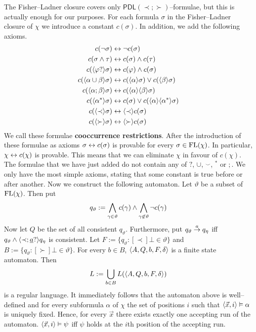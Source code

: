 The Fisher--Ladner closure covers only 
$\mathsf{PDL}(\prec;\succ)$--formulae, but this is actually enough 
for our purposes. For each formula $\sigma$ in the Fisher--Ladner 
closure of $\chi$ we introduce a constant $c(\sigma)$.
In addition, we add the following axioms.
\begin{equation}
\begin{split}
c(\neg\sigma) & \leftrightarrow \neg c(\sigma) \\
c(\sigma\wedge\tau) & \leftrightarrow c(\sigma) \wedge c(\tau) \\
c(\langle\varphi?\rangle\sigma) & \leftrightarrow c(\varphi) \wedge c(\sigma) \\
c(\langle\alpha\cup\beta\rangle\sigma) & \leftrightarrow c(\langle\alpha\rangle\sigma)
        \vee c(\langle\beta\rangle\sigma) \\
c(\langle\alpha;\beta\rangle\sigma) & \leftrightarrow c(\langle\alpha\rangle\langle\beta\rangle\sigma)
        \\
c(\langle\alpha^{\ast}\rangle\sigma) & \leftrightarrow c(\sigma) \vee 
        c(\langle\alpha\rangle\langle\alpha^{\ast}\rangle\sigma) \\
c(\langle\prec\rangle\sigma) & \leftrightarrow \langle\prec\rangle c(\sigma) \\
c(\langle\succ\rangle\sigma) & \leftrightarrow \langle\succ\rangle c(\sigma)
\end{split}
\end{equation}
We call these formulae \textbf{cooccurrence restrictions}.
After the introduction of these formulae as axioms 
$\sigma \leftrightarrow c(\sigma)$ is provable for every $\sigma \in
\operatorname{FL}(\chi)$. In particular, $\chi \leftrightarrow c(\chi)$
is provable. This means that we can eliminate $\chi$ in favour
of $c(\chi)$. The formulae that we have just added do not contain
any of $?$, $\cup$, $^{\smallsmile}$, $^{\ast}$ or $;$. We only
have the most simple axioms, stating that some constant is true
before or after another. Now we construct the following automaton.
Let $\vartheta$ be a subset of $\operatorname{FL}(\chi)$. Then put
\begin{equation}
q_{\vartheta} := \bigwedge_{\gamma \in \vartheta} c(\gamma) \wedge
    \bigwedge_{\gamma \not\in \vartheta} \neg c(\gamma)
\end{equation}
Now let $Q$ be the set of all consistent $q_{\vartheta}$.
Furthermore, put $q_{\vartheta} \stackrel{a}{\rightarrow} q_{\eta}$
iff $q_{\vartheta} \wedge \langle \prec; \underline{a}?\rangle q_{\eta}$
is consistent. Let $F := \{q_{\vartheta} : [\prec]\bot \in \vartheta\}$
and $B := \{q_{\vartheta} : [\succ]\bot \in \vartheta\}$. For every
$b \in B$, $\langle A, Q, b, F, \delta\rangle$ is a finite state
automaton. Then
\begin{equation}
L := \bigcup_{b \in B} L(\langle A, Q, b, F, \delta\rangle)
\end{equation}
is a regular language. It immediately follows that the automaton
above is well--defined and for every subformula $\alpha$ of $\chi$
the set of positions $i$ such that $\langle \vec{x}, i\rangle \vDash \alpha$
is uniquely fixed. Hence, for every $\vec{x}$ there exists exactly
one accepting run of the automaton. $\langle \vec{x}, i\rangle \vDash \psi$
iff $\psi$ holds at the $i$th position of the accepting run.

